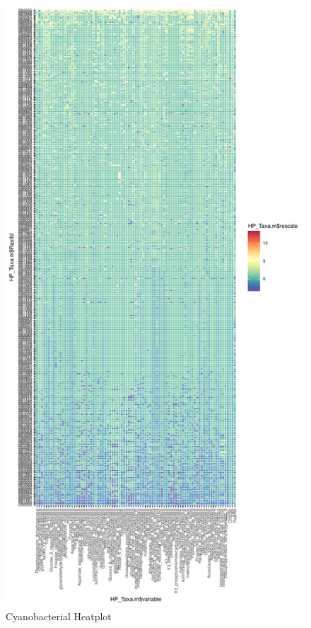 \documentclass[12pt,twoside]{reedthesis}
\begin{document}
  \begin{figure}[h!tbp]
  \centering
  \includegraphics[angle = 0,scale = 0.6]{chapter2/Cyanobacteria/HeatPlot.pdf}
  \caption[Cyanobacterial Heatplot]{\normalsize{Cyanobacterial Heatplot}}
  \label{fig:CyanoPlot}
  \end{figure}
  
\end{document}
